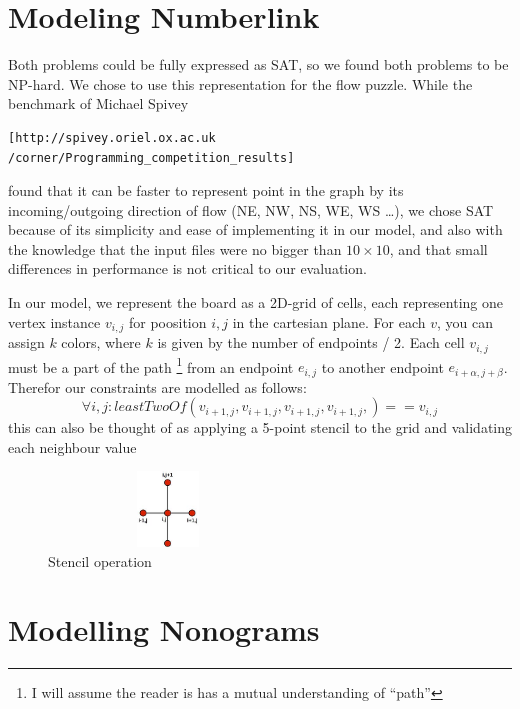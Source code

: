 \documentclass[journal]{IEEEtran}
\begin{document}
\section*{Modeling Numberlink}
Both problems could be fully expressed as SAT, so we found both problems to
be NP-hard. We chose to use this representation for the flow puzzle. 
While the benchmark of Michael Spivey 
\tiny\begin{verbatim}
[http://spivey.oriel.ox.ac.uk
/corner/Programming_competition_results]\end{verbatim}
\normalsize
found that it can be faster to represent point in the graph by its
incoming/outgoing direction of flow (NE, NW, NS, WE, WS \dots), 
we chose SAT because of its simplicity and ease of implementing it in our
model, and also with the knowledge that the input files were no bigger than
$10 \times 10$, and that small differences in performance is not critical to our evaluation.

In our model, we represent the board as a 2D-grid of cells, each representing one
vertex instance $v_{i,j}$ for poosition $i,j$ in the cartesian plane.
For each $v$, you can assign $k$ colors, where $k$ is given by
the number of endpoints / 2. 
Each cell $v_{i,j}$ must be a part of the path
\footnote{I will assume the reader is has a mutual understanding of ``path''}
from an endpoint $e_{i,j}$ to another endpoint $e_{i+\alpha,j+\beta}$.
Therefor our constraints are modelled as follows:
\begin{equation*}
\forall{i,j}: leastTwoOf( v_{i+1,j},v_{i+1,j},v_{i+1,j},v_{i+1,j}, ) == v_{i,j}
\end{equation*}
this can also be thought of as applying a 5-point stencil to the grid
and validating each neighbour value
\begin{figure}[Hb]
\centering
    \includegraphics[height=2cm,keepaspectratio,width=2.5in]{stencil.jpg}
\caption{Stencil operation}
\label{fig:stencil}
\end{figure}


\section*{Modelling Nonograms}
\end{document}
